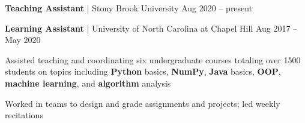 \textbf{Teaching Assistant} | Stony Brook University	\hfill {\small Aug 2020 -- present}

\vspace{2mm}
\textbf{Learning Assistant} | University of North Carolina at Chapel Hill	\hfill {\small Aug 2017 -- May 2020}
\vspace{-3mm}
\begin{zitemize}
\item Assisted teaching and coordinating six undergraduate courses totaling over 1500 students on topics including \textbf{Python} basics, \textbf{NumPy}, \textbf{Java} basics, \textbf{OOP}, \textbf{machine learning}, and \textbf{algorithm} analysis

\item Worked in teams to design and grade assignments and projects; led weekly recitations

\end{zitemize}